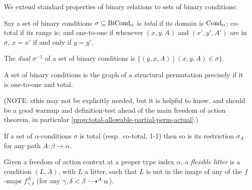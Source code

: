 \begin{definition}
  \label{def:condition-total-1-1}
  We extend standard properties of binary relations to sets of binary conditions:

  Say a set of binary conditions $\sigma \subseteq \mathrm{BiCond}_\alpha$ is \emph{total} if its domain is $\mathrm{Cond}_\alpha$; co-total if its range is; and one-to-one if whenever $(x,y,A)$ and $(x',y',A')$ are in $\sigma$, $x = x'$ if and only if $y = y'$.

  The \emph{dual} $\sigma^{-1}$ of a set of binary conditions is $\{ (y,x,A) \mid (x,y,A) \in \sigma \}$.
\end{definition}

\begin{proposition}
  \label{prop:total-1-1-gives-perm}
  A set of binary conditions is the graph of a structural permutation precisely if it is one-to-one and total.

  (NOTE: sthis may not be explicitly needed, but it is helpful to know, and should be a good warmup and definition-test ahead of the main freedom of action theorem, in particular \cref{prop:total-allowable-partial-perm-actual}.)
\end{proposition}

\begin{proposition}
  \label{prop:total-1-1-restriction}
  If a set of $\alpha$-conditions $\sigma$ is total (resp.\ co-total, 1-1) then so is its restriction $\sigma_A$ for any path $A : \beta \to \alpha$.
\end{proposition}

\begin{definition}
  \label{def:flexible-condition}
  Given a freedom of action context at a proper type index $\alpha$, a \emph{flexible litter} is a condition $(L,A)$, with $L$ a litter, such that $L$ is not in the image of any of the $f$-maps $f^A_{\gamma,\delta}$ (for any $\gamma,\delta < \beta \dashrightarrow^A \alpha$).
\end{definition}

